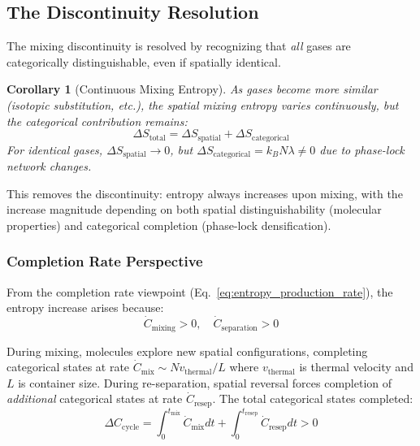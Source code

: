 \documentclass[superscriptaddress,prb,10pt]{revtex4-2}
\newtheorem{corollary}[theorem]{Corollary}
\theoremstyle{definition}
\theoremstyle{remark}
\begin{document}
\subsection{The Discontinuity Resolution}

The mixing discontinuity is resolved by recognizing that \emph{all} gases are categorically distinguishable, even if spatially identical.

\begin{corollary}[Continuous Mixing Entropy]
As gases become more similar (isotopic substitution, etc.), the spatial mixing entropy varies continuously, but the categorical contribution remains:
\begin{equation}
\Delta S_{\text{total}} = \Delta S_{\text{spatial}} + \Delta S_{\text{categorical}}
\end{equation}
For identical gases, $\Delta S_{\text{spatial}} \to 0$, but $\Delta S_{\text{categorical}} = k_B N \lambda \neq 0$ due to phase-lock network changes.
\end{corollary}

This removes the discontinuity: entropy always increases upon mixing, with the increase magnitude depending on both spatial distinguishability (molecular properties) and categorical completion (phase-lock densification).

\subsubsection{Completion Rate Perspective}

From the completion rate viewpoint (Eq.~\ref{eq:entropy_production_rate}), the entropy increase arises because:
\begin{equation}
\dot{C}_{\text{mixing}} > 0, \quad \dot{C}_{\text{separation}} > 0
\end{equation}

During mixing, molecules explore new spatial configurations, completing categorical states at rate $\dot{C}_{\text{mix}} \sim N v_{\text{thermal}}/L$ where $v_{\text{thermal}}$ is thermal velocity and $L$ is container size. During re-separation, spatial reversal forces completion of \emph{additional} categorical states at rate $\dot{C}_{\text{resep}}$. The total categorical states completed:
\begin{equation}
\Delta C_{\text{cycle}} = \int_0^{t_{\text{mix}}} \dot{C}_{\text{mix}} dt + \int_0^{t_{\text{resep}}} \dot{C}_{\text{resep}} dt > 0
\end{equation}
\end{document}
